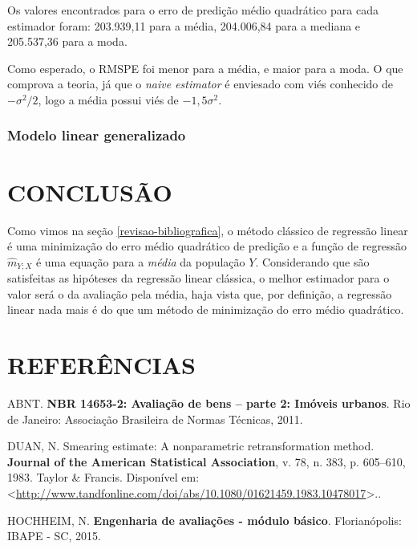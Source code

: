 \documentclass[a4paper]{article}
\begin{document}
Os valores encontrados para o erro de predição médio quadrático para
cada estimador foram: 203.939,11 para a média, 204.006,84 para a mediana
e 205.537,36 para a moda.

Como esperado, o RMSPE foi menor para a média, e maior para a moda. O
que comprova a teoria, já que o \emph{naive estimator} é enviesado com
viés conhecido de \(-\sigma^2/2\), logo a média possui viés de
\(-1,5\sigma^2\).

\newpage

\subsubsection{Modelo linear
generalizado}\label{modelo-linear-generalizado}

\section{CONCLUSÃO}\label{conclusao}

Como vimos na seção \ref{revisao-bibliografica}, o método clássico de
regressão linear é uma minimização do erro médio quadrático de predição
e a função de regressão \(\hat{m}_{Y;X}\) é uma equação para a
\emph{média} da população \(Y\). Considerando que são satisfeitas as
hipóteses da regressão linear clássica, o melhor estimador para o valor
será o da avaliação pela média, haja vista que, por definição, a
regressão linear nada mais é do que um método de minimização do erro
médio quadrático.

\section*{REFERÊNCIAS}\label{referencias}

\hypertarget{refs}{}
\hypertarget{ref-NBR1465302}{}
ABNT. \textbf{NBR 14653-2: Avaliação de bens -- parte 2: Imóveis
urbanos}. Rio de Janeiro: Associação Brasileira de Normas Técnicas,
2011.

\hypertarget{ref-Duan}{}
DUAN, N. Smearing estimate: A nonparametric retransformation method.
\textbf{Journal of the American Statistical Association}, v. 78, n. 383,
p. 605--610, 1983. Taylor \& Francis. Disponível em:
\textless{}\url{http://www.tandfonline.com/doi/abs/10.1080/01621459.1983.10478017}\textgreater{}..

\hypertarget{ref-hochheim}{}
HOCHHEIM, N. \textbf{Engenharia de avaliações - módulo básico}.
Florianópolis: IBAPE - SC, 2015.
\end{document}
